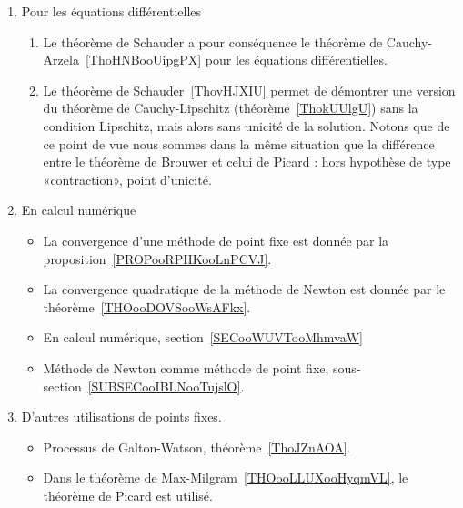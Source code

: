 \begin{enumerate}
	\item Pour les équations différentielles
	      \begin{enumerate}
		      \item
		            Le théorème de Schauder a pour conséquence le théorème de Cauchy-Arzela~\ref{ThoHNBooUipgPX} pour les équations différentielles.
		      \item
		            Le théorème de Schauder~\ref{ThovHJXIU} permet de démontrer une version du théorème de Cauchy-Lipschitz (théorème~\ref{ThokUUlgU}) sans la condition Lipschitz, mais alors sans unicité de la solution. Notons que de ce point de vue nous sommes dans la même situation que la différence entre le théorème de Brouwer et celui de Picard : hors hypothèse de type «contraction», point d'unicité.
	      \end{enumerate}
	\item
	      En calcul numérique
	      \begin{itemize}
		      \item
		            La convergence d'une méthode de point fixe est donnée par la proposition~\ref{PROPooRPHKooLnPCVJ}.
		      \item
		            La convergence quadratique de la méthode de Newton est donnée par le théorème~\ref{THOooDOVSooWsAFkx}.
		      \item
		            En calcul numérique, section~\ref{SECooWUVTooMhmvaW}
		      \item
		            Méthode de Newton comme méthode de point fixe, sous-section~\ref{SUBSECooIBLNooTujslO}.
	      \end{itemize}

	\item
	      D'autres utilisations de points fixes.
	      \begin{itemize}
		      \item
		            Processus de Galton-Watson, théorème~\ref{ThoJZnAOA}.
		      \item
		            Dans le théorème de Max-Milgram~\ref{THOooLLUXooHyqmVL}, le théorème de Picard est utilisé.
	      \end{itemize}
\end{enumerate}
